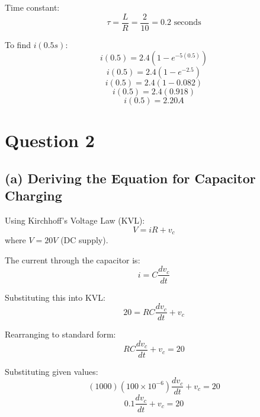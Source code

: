 \documentclass[12pt]{article}
\begin{document}
	Time constant:
	\begin{equation}
		\tau = \frac{L}{R} = \frac{2}{10} = 0.2 \text{ seconds}
	\end{equation}
	
	To find \( i(0.5s) \):
	\begin{equation}
		i(0.5) = 2.4(1 - e^{-5(0.5)})
	\end{equation}
	\begin{equation}
		i(0.5) = 2.4(1 - e^{-2.5})
	\end{equation}
	\begin{equation}
		i(0.5) = 2.4(1 - 0.082)
	\end{equation}
	\begin{equation}
		i(0.5) = 2.4(0.918)
	\end{equation}
	\begin{equation}
		i(0.5) = 2.20A
	\end{equation}
	

	
	
	
	
	
	\section*{Question 2}
	\subsection*{(a) Deriving the Equation for Capacitor Charging}
	
	Using Kirchhoff's Voltage Law (KVL):
	\begin{equation}
		V = iR + v_c
	\end{equation}
	where \( V = 20V \) (DC supply).
	
	The current through the capacitor is:
	\begin{equation}
		i = C \frac{dv_c}{dt}
	\end{equation}
	
	Substituting this into KVL:
	\begin{equation}
		20 = RC \frac{dv_c}{dt} + v_c
	\end{equation}
	
	Rearranging to standard form:
	\begin{equation}
		RC \frac{dv_c}{dt} + v_c = 20
	\end{equation}
	
	Substituting given values:
	\begin{equation}
		(1000)(100 \times 10^{-6}) \frac{dv_c}{dt} + v_c = 20
	\end{equation}
	\begin{equation}
		0.1 \frac{dv_c}{dt} + v_c = 20
	\end{equation}
	
\end{document}
